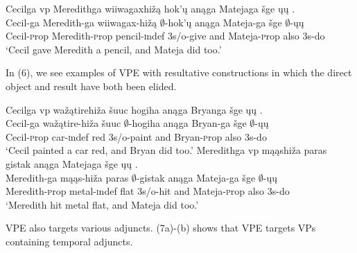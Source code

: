 \documentclass[output=paper]{LSP/langsci}
\begin{document}
\begin{exe}
\ex
\glll Cecilga {\ob}{vp} Meredithga wiiwagaxhižą hok'ų{\cb} anąga Matejaga šge {\ob}ųų{\cb} .\\
Cecil-ga {} Meredith-ga wiiwagax-hižą $\emptyset$-hok'ų anąga Mateja-ga šge $\emptyset$-ųų\\
Cecil-{\textsc prop} {} Meredith-{\textsc prop} pencil-{\textsc indef} {\textsc 3s/o}-give and Mateja-{\textsc prop} also {\textsc 3s}-do\\
\trans `Cecil gave Meredith a pencil, and Mateja did too.'
\end{exe}

In (6), we see examples of VPE with resultative constructions in which the direct object and result have both been elided. 

\begin{exe}
\ex
\begin{xlist}
\ex
\glll Cecilga  {\ob}{vp} wažątirehiža šuuc hogiha{\cb} anąga Bryanga šge {\ob}ųų{\cb} .\\
Cecil-ga {} wažątire-hiža šuuc $\emptyset$-hogiha anąga Bryan-ga šge $\emptyset$-ųų\\
Cecil-{\textsc prop} {} car-{\textsc indef} red {\textsc 3s/o}-paint and Bryan-{\textsc prop} also {\textsc 3s}-do\\
\trans `Cecil painted a car red, and Bryan did too.'
\ex
\glll Meredithga  {\ob}{vp} mąąshiža paras gistak{\cb} anąga Matejaga šge {\ob}ųų{\cb} .\\
Meredith-ga {} mąąs-hiža paras $\emptyset$-gistak anąga Mateja-ga šge $\emptyset$-ųų\\
Meredith-{\textsc prop} {} metal-{\textsc indef} flat {\textsc 3s/o}-hit and Mateja-{\textsc prop} also {\textsc 3s}-do\\
\trans `Meredith hit metal flat, and Mateja did too.'
\end{xlist}
\end{exe}

VPE also targets various adjuncts. (7a)-(b) shows that VPE targets VPs containing temporal adjuncts. 
\end{document}

